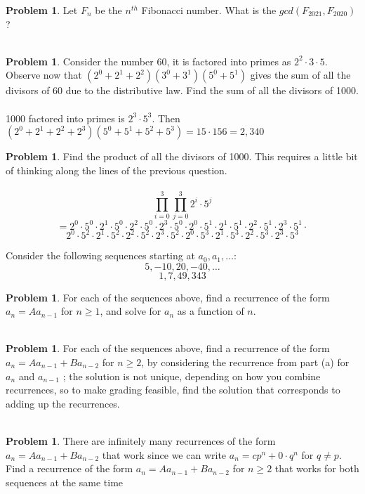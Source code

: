 \documentclass[10pt,leqno ]{article}
\theoremstyle{definition}
\newtheorem{problem}[theorem]{Problem}
\begin{document}
\begin{problem} Let $F_n$ be the $n^{th}$ Fibonacci number.  What is the $gcd(F_{2021}, F_{2020})$?
\\\\
\Large
\end{problem}
\newpage

\begin{problem} Consider the number 60, it is factored into primes as $2^2 \cdot 3 \cdot 5$.  Observe now that $(2^0+ 2^1+ 2^2)(3^0+ 3^1)(5^0+ 5^1)$ gives the sum of all the divisors of 60 due to the distributive law.  Find the sum of all the divisors of 1000.
\\\\
\Large
1000 factored into primes is $2^3 \cdot 5^3$.  Then $(2^0 + 2^1 + 2^2 + 2^3)( 5^0 + 5^1 + 5^2 + 5^3) = 15 \cdot 156 = 2,340$
\end{problem}
\newpage

\begin{problem} Find the product of all the divisors of 1000.  This requires a little bit of thinking along the lines of the previous question.
\\\\
\Large
$$\prod_{i=0}^{3} \prod_{j=0}^{3}2^i \cdot 5^j$$
$$= 2^0 \cdot 5^0 \cdot 2^1 \cdot 5^0 \cdot 2^2 \cdot 5^0 \cdot 2^3 \cdot 5^0 \cdot 2^0 \cdot 5^1 \cdot 2^1 \cdot 5^1 \cdot 2^2 \cdot 5^1 \cdot 2^3 \cdot 5^1 \cdot$$
$$2^0 \cdot 5^2 \cdot 2^1 \cdot 5^2 \cdot 2^2 \cdot 5^2 \cdot 2^3 \cdot 5^2 \cdot 2^0 \cdot 5^3 \cdot 2^1 \cdot 5^3 \cdot 2^2 \cdot 5^3 \cdot 2^3 \cdot 5^3$$
\end{problem}
\newpage

Consider the following sequences starting at $a_0, a_1, \dots$:
$$5, -10, 20, -40, \dots$$
$$ 1, 7, 49, 343$$
\begin{problem} For each of the sequences above, find a recurrence of the form $a_n = Aa_{n-1}$ for $n \geq 1$, and solve for $a_n$ as a function of $n$.
\\\\
\Large
\end{problem}
\newpage

\begin{problem} For each of the sequences above, find a recurrence of the form $a_n=Aa_{n-1} + Ba_{n-2}$ for $n \geq 2$, by considering the recurrence from part (a) for $a_n$ and $a_{n-1}$ ; the solution is not unique,  depending on how you combine recurrences,  so to make grading feasible, find the solution that corresponds to adding up the recurrences.
\\\\
\Large
\end{problem}
\newpage

\begin{problem} There are infinitely many recurrences of the form $a_n=Aa_{n-1}+Ba_{n-2}$ that work since we can write $a_n=cp^n+ 0 \cdot q^n$ for $q \neq p$.  Find a recurrence of the form $a_n=Aa_{n-1}+Ba_{n-2}$ for $n \geq 2$ that works for both sequences at the same time
\\\\
\Large
\end{problem}
\newpage
\end{document}
